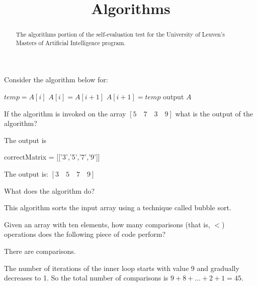 \documentclass{ximera}
\title{Algorithms}
\begin{document}
\begin{abstract}
The algorithms portion of the self-evaluation test for the University
of Leuven's Masters of Artificial Intelligence program.
\end{abstract}
\maketitle

\begin{question}
Consider the algorithm below for: 
\begin{algorithm}%
\begin{algorithmic}
  \STATE $temp = A[i]$
  \STATE $A[i] = A[i+1]$
  \STATE $A[i+1] = temp$
  \ENDIF
  \ENDFOR
  \ENDFOR
  \STATE output $A$
\end{algorithmic}
\end{algorithm}



If the algorithm is invoked on the array $[ 5\quad 7\quad 3\quad 9]$ what is the output of the algorithm?
\begin{solution}
The output is 
\begin{matrix-answer}[name=M]
    correctMatrix = [['3','5','7','9']]
\end{matrix-answer}
\end{solution}

The output is:
$ [3 \quad 5 \quad 7 \quad 9] $

What does the algorithm do? 
\begin{free-response}
\end{free-response}
This algorithm sorts the input array using a technique called bubble sort.

Given an array with ten elements, how many comparisons (that is, $<$)
operations does the following piece of code perform?
\begin{solution}
There are  comparisons.
\end{solution}  
The number of iterations of the inner loop starts with value 9 and
gradually decreases to 1. So the total number of comparisons is $ 9 +
8 + \ldots + 2 + 1 = 45$.


\end{question}
\end{document}
